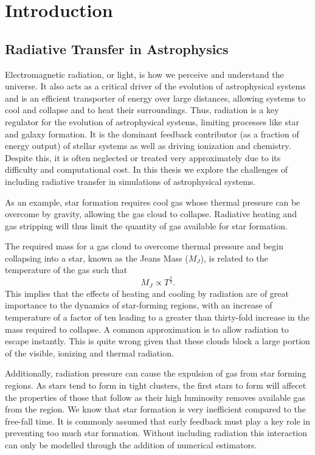 \setlength{\parskip}{1em}

\chapter{Introduction}

\section{Radiative Transfer in Astrophysics}

Electromagnetic radiation, or light, is how we perceive and understand the universe. It also acts as a critical driver of the evolution of astrophysical systems and is an efficient transporter of energy over large distances, allowing systems to cool and collapse and to heat their surroundings. Thus, radiation is a key regulator for the evolution of astrophysical systems, limiting processes like star and galaxy formation. It is the dominant feedback contributor (as a fraction of energy output) of stellar systems as well as driving ionization and chemistry. Despite this, it is often neglected or treated very approximately due to its difficulty and computational cost. In this thesis we explore the challenges of including radiative transfer in simulations of astrophysical systems.

As an example, star formation requires cool gas whose thermal pressure can be overcome by gravity, allowing the gas cloud to collapse. Radiative heating and gas stripping \citep{gasStripping} will thus limit the quantity of gas available for star formation.

The required mass for a gas cloud to overcome thermal pressure and begin collapsing into a star, known as the Jeans Mass ($M_J$), is related to the temperature of the gas such that
\begin{equation}
    M_J \propto T^\frac{3}{2}.
\end{equation}
This implies that the effects of heating and cooling by radiation are of great importance to the dynamics of star-forming regions, with an increase of temperature of a factor of ten leading to a greater than thirty-fold increase in the mass required to collapse. A common approximation is to allow radiation to escape instantly. This is quite wrong given that these clouds block a large portion of the visible, ionizing and thermal radiation.

Additionally, radiation pressure can cause the expulsion of gas from star forming regions. As stars tend to form in tight clusters, the first stars to form will affecet the properties of those that follow as their high luminosity removes available gas from the region. We know that star formation is very inefficient compared to the free-fall time. It is commonly assumed that early feedback must play a key role in preventing too much star formation. Without including radiation this interaction can only be modelled through the addition of numerical estimators.

